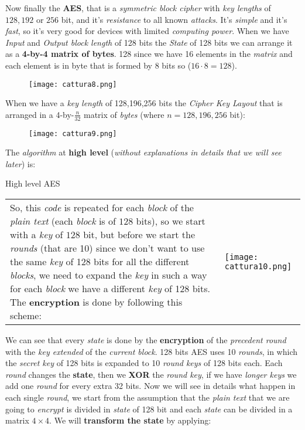\documentclass{article}
\begin{document}
\clearpage
\hfill \break
Now finally the \textbf{AES}, that is a \emph{symmetric block cipher} with\emph{ key lengths} of $128,192$ or $256$ bit, and it's \emph{resistance} to all known \emph{attacks}. It's \emph{simple} and it's \emph{fast}, so it's very good for devices with limited \emph{computing power}. When we have \emph{Input} and \emph{Output block length} of 128 bits the \emph{State} of 128 bits we can arrange it as a\textbf{ 4-by-4 matrix of bytes}. 128 since we have 16 elements in the \emph{matrix} and each element is in byte that is formed by 8 bits so ($16 \cdot 8 = 128$). 
\begin{figure}[H]
  \centering
  \texttt{[image: cattura8.png]}
\end{figure}
When we have a \emph{key length} of 128,196,256 bits the \emph{Cipher Key Layout} that is arranged in a 4-by-$\frac{n}{32}$ matrix of \emph{bytes} (where $n= 128,196,256$ bit):
\begin{figure}[H]
  \centering
  \texttt{[image: cattura9.png]}
\end{figure}
The \emph{algorithm} at \textbf{high level} (\emph{without explanations in details that we will see later}) is:\\
\begin{algorithm}[H]
\renewcommand{\thealgorithm}{}
\caption{High level AES}
\end{algorithm}
\begin{tabular}{C{9cm}  L{10.5cm}}
So, this \emph{code} is repeated for each \emph{block} of the \emph{plain text} (each \emph{block} is of $128$ bits), so we start with a \emph{key} of $128$ bit, but before we start the \emph{rounds} (that are 10) since we don't want to use the same \emph{key} of 128 bits for all the different \emph{blocks}, we need to expand the \emph{key} in such a way for each \emph{block} we have a different \emph{key} of 128 bits. The \textbf{encryption} is done by following this scheme:
  & 
  \texttt{[image: cattura10.png]}
\end{tabular}
\clearpage
\hfill\break
We can see that every \emph{state} is done by the \textbf{encryption} of the \emph{precedent round} with the \emph{key extended} of the \emph{current block}. 128 bits AES uses 10 \emph{rounds}, in which the \emph{secret key} of 128 bits is expanded to 10 \emph{round keys} of 128 bits each. Each \emph{round} changes the \textbf{state}, then we \textbf{XOR} the \emph{round key}, if we have \emph{longer keys} we add one \emph{round} for every extra 32 bits. Now we will see in details what happen in each single \emph{round}, we start from the assumption that the \emph{plain text} that we are going to \emph{encrypt} is divided in \emph{state} of 128 bit and each \emph{state} can be divided in a matrix $4 \times 4$. We will \textbf{transform the state} by applying:\\
\end{document}
